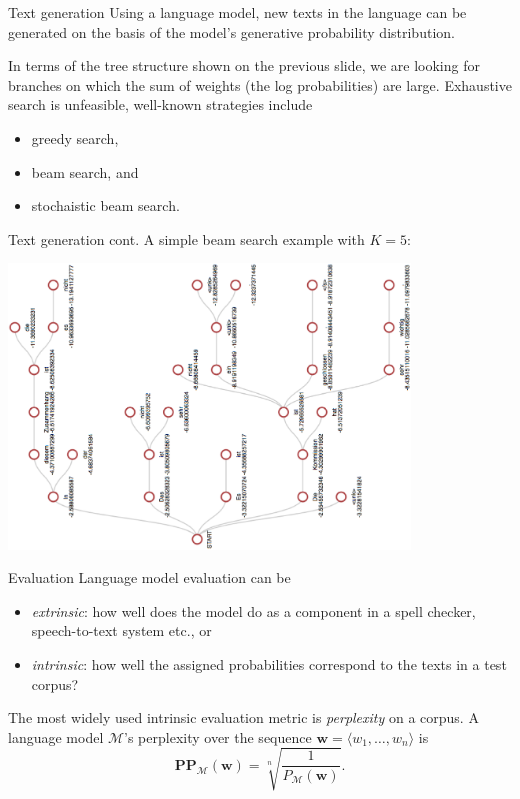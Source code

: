 \documentclass[style=upen, size=14pt]{powerdot}
\newcommand{\gold}{\color{arany}}
\theoremstyle{definition}
\begin{document}
\begin{slide}[toc=Text generation]{Text generation}
  Using a language model, new texts in the language can be generated on the
  basis of the model's generative probability distribution.

  In terms of the tree structure shown on the previous slide, we are looking for
  branches on which the sum of weights (the log probabilities) are large.
  Exhaustive search is unfeasible, well-known strategies include
  \begin{itemize}
  \item greedy search,
  \item beam search, and
  \item stochaistic beam search.
  \end{itemize}
\end{slide}

\begin{slide}[toc=Text generation]{Text generation cont.}
  \small{A simple beam search example with $K=5$:}
  \begin{center}
    \includegraphics[width=0.8\textwidth]{figures/beam_search.eps}
  \end{center}
\end{slide}

\begin{slide}[toc=Evaluation]{Evaluation}
  Language model evaluation can be
  \begin{itemize}
  \item \emph{\gold extrinsic}: how well does the model do as a component in a
    spell checker, speech-to-text system etc., or
  \item \emph{\gold intrinsic}: how well the assigned probabilities correspond
    to the texts in a test corpus?
  \end{itemize}
  The most widely used intrinsic evaluation metric is \emph{\gold perplexity} on
  a corpus. A language model $\mathcal M$'s perplexity over the sequence
  $\mathbf w = \langle w_1,\dots, w_n\rangle$ is
$$\mathbf{PP}_{\mathcal M}(\mathbf w) = \sqrt[n]{\frac{1}{P_{\mathcal M}(\mathbf w)}}.$$
\end{slide}
\end{document}
